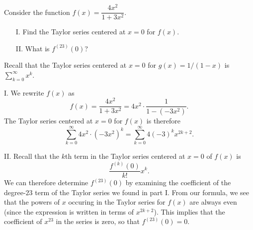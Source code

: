 \documentclass[]{ximera}
\begin{document}
\begin{problem} 
Consider the function $f(x) = \dfrac{4x^2}{1+3x^2}.$

\begin{itemize}
\item[I.] Find the Taylor series centered at $x=0$ for $f(x)$.
\item[II.] What is $f^{(23)}(0)$?
\end{itemize}

\begin{solution}
Recall that the Taylor series centered at $x=0$ for $g(x) =1/(1-x)$ is $\sum_{k=0}^\infty x^k$. 

I. We rewrite $f(x)$ as
$$
f(x) = \frac{4x^2}{1+3x^2} = 4x^2 \cdot \frac{1}{1-(-3x^2)}.
$$
The Taylor series centered at $x=0$ for $f(x)$ is therefore
$$
\sum_{k=0}^\infty 4x^2 \cdot (-3x^2)^k = \sum_{k=0}^\infty 4  (-3)^k x^{2k+2}.
$$

II. Recall that the $k$th term in the Taylor series centered at $x=0$ of $f(x)$ is 
$$
\frac{f^{(k)}(0)}{k!} x^k.
$$
We can therefore determine $f^{(23)}(0)$ by examining the coefficient of the degree-$23$ term of the Taylor series we found in part I. From our formula, we see that the powers of $x$ occuring in the Taylor series for $f(x)$ are always even (since the expression is written in terms of $x^{2k+2}$). This implies that the coefficient of $x^{23}$ in the series is zero, so that $f^{(23)}(0)=0$.
\end{solution}
\end{problem}
\end{document}
